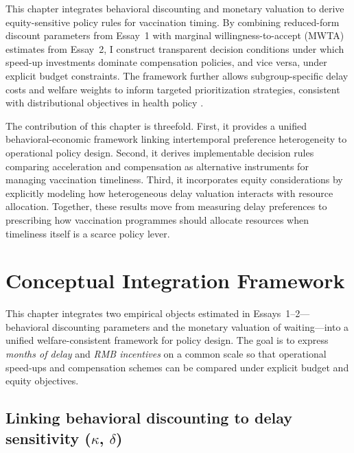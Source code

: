 \documentclass[doublespacing]{utdthesis}
\let\cite=\citep
\begin{document}
This chapter integrates behavioral discounting and monetary valuation to derive equity-sensitive policy rules for vaccination timing. By combining reduced-form discount parameters from Essay~1 with marginal willingness-to-accept (MWTA) estimates from Essay~2, I construct transparent decision conditions under which speed-up investments dominate compensation policies, and vice versa, under explicit budget constraints. The framework further allows subgroup-specific delay costs and welfare weights to inform targeted prioritization strategies, consistent with distributional objectives in health policy \cite{Cookson2017,Asaria2016}.

The contribution of this chapter is threefold. First, it provides a unified behavioral-economic framework linking intertemporal preference heterogeneity to operational policy design. Second, it derives implementable decision rules comparing acceleration and compensation as alternative instruments for managing vaccination timeliness. Third, it incorporates equity considerations by explicitly modeling how heterogeneous delay valuation interacts with resource allocation. Together, these results move from measuring delay preferences to prescribing how vaccination programmes should allocate resources when timeliness itself is a scarce policy lever.


\section{Conceptual Integration Framework}
\label{sec:essay3_framework}

This chapter integrates two empirical objects estimated in Essays~1--2—behavioral discounting parameters and the monetary valuation of waiting—into a unified welfare-consistent framework for policy design. The goal is to express \emph{months of delay} and \emph{RMB incentives} on a common scale so that operational speed-ups and compensation schemes can be compared under explicit budget and equity objectives.

\subsection{Linking behavioral discounting to delay sensitivity ($\kappa$, $\delta$)}
\label{subsec:essay3_link_kappa_delta}
\end{document}
